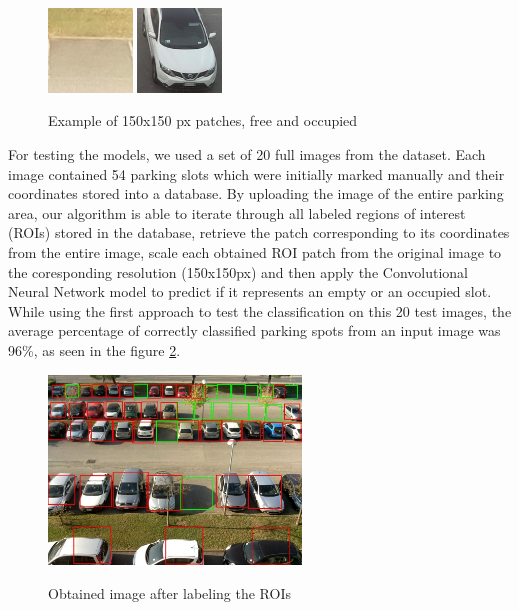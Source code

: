 \documentclass[12pt]{article}
\begin{document}
\begin{figure}
\caption{Example of 150x150 px patches, free and occupied}
\includegraphics[width=0.2\textwidth]{20150703_0810_10}
\includegraphics[width=0.2\textwidth]{20150703_0810_45}
\label{fig:patchesimg}
\end{figure}

\clearpage
For testing the models, we used a set of 20 full images from the \cite{cnrpark} dataset.
Each image contained 54 parking slots which were initially marked manually and their coordinates stored into a database. By uploading the image of the entire parking area,
our algorithm is able to iterate through all labeled regions of interest (ROIs) stored in the database, retrieve the patch corresponding to its coordinates from the entire image,
scale each obtained ROI patch from the original image to the coresponding resolution (150x150px)
and then apply the Convolutional Neural Network model to predict if it represents an empty or an occupied slot.
While using the first approach to test the classification on this 20 test images, the average percentage of correctly classified parking spots from an input image was 96\%, as seen in the figure \ref{fig:resultimg}.

\begin{figure}
\caption{Obtained image after labeling the ROIs}
\includegraphics[width=0.6\textwidth]{2015-11-12_0947}
\label{fig:resultimg}
\end{figure}
\end{document}
